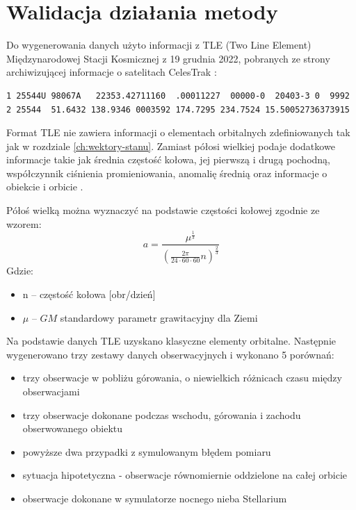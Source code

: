 \clearpage %
\section{Walidacja działania metody}

Do wygenerowania danych użyto informacji z TLE (Two Line Element) Międzynarodowej Stacji Kosmicznej z 19 grudnia 2022, pobranych ze strony archiwizującej informacje o satelitach CelesTrak \cite{Celestrak}:
\begin{verbatim}
1 25544U 98067A   22353.42711160  .00011227  00000-0  20403-3 0  9992
2 25544  51.6432 138.9346 0003592 174.7295 234.7524 15.50052736373915
\end{verbatim}

Format TLE nie zawiera informacji o elementach orbitalnych zdefiniowanych tak jak w rozdziale \ref{ch:wektory-stanu}. Zamiast półosi wielkiej podaje dodatkowe informacje takie jak średnia częstość kołowa, jej pierwszą i drugą pochodną, współczynnik ciśnienia promieniowania, anomalię średnią oraz informacje o obiekcie i orbicie \cite{TLE}.

Półoś wielką można wyznaczyć na podstawie częstości kołowej zgodnie ze wzorem:
\begin{equation}
a = \frac{\mu^{\frac{1}{3}}}{\left(\frac{2\pi}{24\cdot60\cdot60}n\right)^{\frac{2}{3}}}
\end{equation}
Gdzie: 
\begin{itemize}
\item n -- częstość kołowa [obr/dzień]
\item       $\mu$ -- $GM$ standardowy parametr grawitacyjny dla Ziemi
\end{itemize}

Na podstawie danych TLE uzyskano klasyczne elementy orbitalne. Następnie wygenerowano trzy zestawy danych obserwacyjnych i wykonano 5 porównań:
\begin{itemize}
    \item trzy obserwacje w pobliżu górowania, o niewielkich różnicach czasu między obserwacjami 
    \item trzy obserwacje dokonane podczas wschodu, górowania i zachodu obserwowanego obiektu
    \item powyższe dwa przypadki z symulowanym błędem pomiaru
    \item sytuacja hipotetyczna - obserwacje równomiernie oddzielone na całej orbicie
    \item obserwacje dokonane w symulatorze nocnego nieba Stellarium
\end{itemize}

